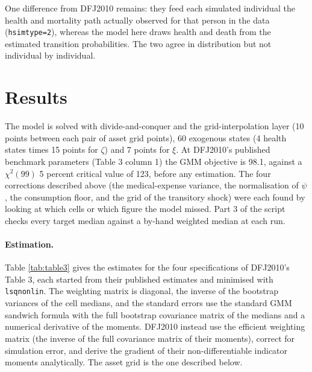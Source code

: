 \documentclass[11pt,fleqn]{article}
\begin{document}
One difference from DFJ2010 remains: they feed each simulated individual the health and mortality path actually observed for that person in the data (\texttt{hsimtype=2}), whereas the model here draws health and death from the estimated transition probabilities. The two agree in distribution but not individual by individual.

\section{Results}\label{sec:results}
The model is solved with divide-and-conquer and the grid-interpolation layer (10 points between each pair of asset grid points), 60 exogenous states (4 health states times 15 points for $\zeta$) and 7 points for $\xi$. At DFJ2010's published benchmark parameters (Table 3 column 1) the GMM objective is 98.1, against a $\chi^2(99)$ 5 percent critical value of 123, before any estimation. The four corrections described above (the medical-expense variance, the normalisation of $\psi$, the consumption floor, and the grid of the transitory shock) were each found by looking at which cells or which figure the model missed. Part 3 of the script checks every target median against a by-hand weighted median at each run.

\paragraph{Estimation.} Table \ref{tab:table3} gives the estimates for the four specifications of DFJ2010's Table 3, each started from their published estimates and minimised with \texttt{lsqnonlin}. The weighting matrix is diagonal, the inverse of the bootstrap variances of the cell medians, and the standard errors use the standard GMM sandwich formula with the full bootstrap covariance matrix of the medians and a numerical derivative of the moments. DFJ2010 instead use the efficient weighting matrix (the inverse of the full covariance matrix of their moments), correct for simulation error, and derive the gradient of their non-differentiable indicator moments analytically. The asset grid is the one described below.
\end{document}
